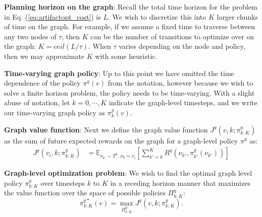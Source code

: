 \documentclass{article}
\newcommand{\ph}[1]{{\textbf{#1}:}} %
\newcommand{\argmax}{\mathop{\mathrm{argmax}}}
\begin{document}
\ph{Planning horizon on the graph}
Recall the total time horizon for the problem in Eq. (\ref{eq:artifactopt_cost}) is $L$.  We wish to discretize this into $K$ larger chunks of time on the graph.  For example, if we assume a fixed time to traverse between any two nodes of $\tau$, then $K$ can be the number of transitions to optimize over on the graph: $K=ceil(L/\tau)$.  When $\tau$ varies depending on the node and policy, then we may approximate $K$ with some heuristic.

\ph{Time-varying graph policy}
Up to this point we have omitted the time dependence of the policy $\pi^g(v)$ from the notation, however because we wish to solve a finite horizon problem, the policy needs to be time-varying.  With a slight abuse of notation, let $k=0,\cdots,K$ indicate the graph-level timesteps, and we write our time-varying graph policy as $\pi^g_k(v)$. 

\ph{Graph value function}
Next we define the graph value function $J^g(v,k;\pi^g_{k:K})$ as the sum of future expected rewards on the graph for a graph-level policy $\pi^g$ as:
\begin{align}
    J^g(v_i,k;\pi^g_{k:K}) &= \mathbb{E}_{\nu_{k'}\sim T^g,\, \nu_k=v_i} \left[ \sum_{k'=k}^K R^g(\nu_{k'}, \pi^g_{k'}(\nu_{k'})) \right]
    \label{eq:graphvaluefn}
\end{align}

\ph{Graph-level optimization problem}
We wish to find the optimal graph level policy $\pi^g_{k:K}$ over timesteps $k$ to $K$ in a receding horizon manner that maximizes the value function over the space of possible policies $\Pi^g_{k:K}$:
\begin{equation}
    \pi^{g*}_{k:K}(v)=\max_{\Pi^g_{k:K}} J^g(v,k;\pi^g_{k:K}).
    \label{eq:graphoptprob}
\end{equation}



\end{document}
